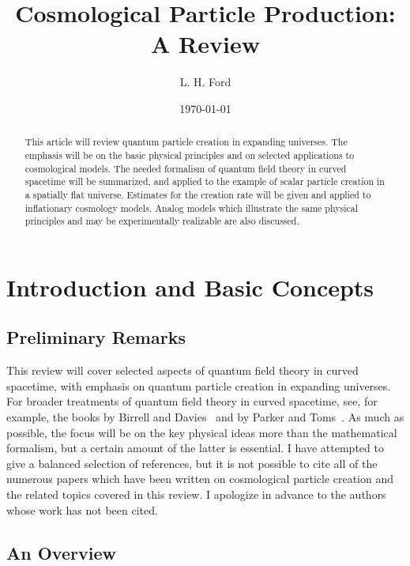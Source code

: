 \documentclass[eqsecnum,floats,aps,prd,floatfix,titlepage,tightenlines]{revtex4}
\begin{document}
\title{Cosmological Particle Production: A Review}
\author{L. H. Ford}
\date{\today}

\begin{abstract}
This article will review quantum particle creation in expanding universes. The emphasis will be on the basic physical
principles and on selected applications to cosmological models. The needed formalism of quantum field theory in
curved spacetime will be summarized, and applied to the example of scalar particle creation in a spatially flat universe.
Estimates for the creation rate will be given and applied to inflationary cosmology models. Analog models which
illustrate the same physical principles and may be experimentally realizable are also discussed. 
\end{abstract}

\maketitle


\section{Introduction and Basic Concepts}
\label{sec:basic}

\subsection{Preliminary Remarks}
\label{sec:prelim}

This review will cover selected aspects of quantum field theory in curved spacetime, with emphasis
on quantum particle creation in expanding universes. For broader treatments of quantum field theory 
in curved spacetime, see, for example, the books by Birrell and Davies~\cite{BD} and by Parker 
and Toms~\cite{PT}. As much as possible, the focus will be on the key physical ideas more than
the mathematical formalism, but a certain amount of the latter is essential. I have attempted to give
a balanced selection of references, but it is not possible to cite all of the numerous papers which have 
been written on cosmological particle creation and the related topics covered in this review.
I apologize in advance to the authors whose work has not been cited.


\subsection{An Overview}
\label{sec:overview}
\end{document}
